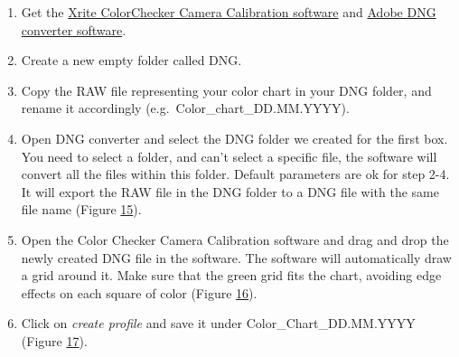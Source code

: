 \documentclass[
]{book}
\theoremstyle{definition}
\theoremstyle{definition}
\theoremstyle{definition}
\theoremstyle{definition}
\theoremstyle{remark}
\begin{document}
\begin{enumerate}
\def\labelenumi{\arabic{enumi}.}
\item
  Get the \href{https://xritephoto.com/ph_product_overview.aspx?ID=938\&Action=Support\&SoftwareID=2030}{Xrite ColorChecker Camera Calibration
  software}
  and \href{https://helpx.adobe.com/photoshop/using/adobe-dng-converter.html}{Adobe DNG converter
  software}.
\item
  Create a new empty folder called DNG.
\item
  Copy the RAW file representing your color chart in your DNG folder,
  and rename it accordingly (e.g.~Color\_chart\_DD.MM.YYYY).
\item
  Open DNG converter and select the DNG folder we created for the
  first box. You need to select a folder, and can't select a specific
  file, the software will convert all the files within this folder.
  Default parameters are ok for step 2-4. It will export the RAW file
  in the DNG folder to a DNG file with the same file name (Figure
  \protect\hyperlink{adobe_dng}{15}).
\item
  Open the Color Checker Camera Calibration software and drag and drop
  the newly created DNG file in the software. The software will
  automatically draw a grid around it. Make sure that the green grid
  fits the chart, avoiding edge effects on each square of color
  (Figure \protect\hyperlink{color_checker_camera_calibration}{16}).
\item
  Click on \emph{create profile} and save it under Color\_Chart\_DD.MM.YYYY
  (Figure \protect\hyperlink{color_checker_profile}{17}).
\end{enumerate}
\end{document}

